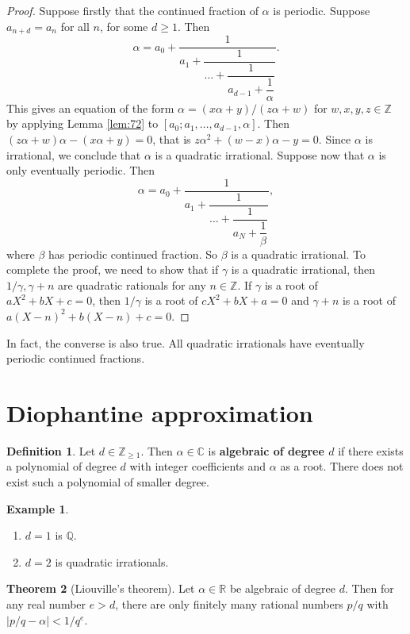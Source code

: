 \documentclass{article}
\newcommand{\Z}{\mathbb{Z}}
\newcommand{\Q}{\mathbb{Q}}
\newcommand{\R}{\mathbb{R}}
\newcommand{\C}{\mathbb{C}}
\newcommand{\rb}[1]{\left( #1 \right)}
\renewcommand{\sb}[1]{\left[ #1 \right]}
\newcommand{\abs}[1]{\left\lvert #1 \right\rvert}
\theoremstyle{definition}\newtheorem{definition}{Definition}
\theoremstyle{definition}\newtheorem{remark}[definition]{Remark}
\theoremstyle{definition}\newtheorem*{example}{Example}
\theoremstyle{definition}\newtheorem*{note}{Note}
\newtheorem{theorem}[definition]{Theorem}
\begin{document}
\begin{proof}
Suppose firstly that the continued fraction of $ \alpha $ is periodic. Suppose $ a_{n + d} = a_n $ for all $ n $, for some $ d \ge 1 $. Then
$$ \alpha = a_0 + \dfrac{1}{a_1 + \dfrac{1}{\dots + \dfrac{1}{a_{d - 1} + \dfrac{1}{\alpha}}}}. $$
This gives an equation of the form $ \alpha = \rb{x\alpha + y} / \rb{z\alpha + w} $ for $ w, x, y, z \in \Z $ by applying Lemma \ref{lem:72} to $ \sb{a_0; a_1, \dots, a_{d - 1}, \alpha} $. Then $ \rb{z\alpha + w}\alpha - \rb{x\alpha + y} = 0 $, that is $ z\alpha^2 + \rb{w - x}\alpha - y = 0 $. Since $ \alpha $ is irrational, we conclude that $ \alpha $ is a quadratic irrational. Suppose now that $ \alpha $ is only eventually periodic. Then
$$ \alpha = a_0 + \dfrac{1}{a_1 + \dfrac{1}{\dots + \dfrac{1}{a_N + \dfrac{1}{\beta}}}}, $$
where $ \beta $ has periodic continued fraction. So $ \beta $ is a quadratic irrational. To complete the proof, we need to show that if $ \gamma $ is a quadratic irrational, then $ 1 / \gamma, \gamma + n $ are quadratic rationals for any $ n \in \Z $. If $ \gamma $ is a root of $ aX^2 + bX + c = 0 $, then $ 1 / \gamma $ is a root of $ cX^2 + bX + a = 0 $ and $ \gamma + n $ is a root of $ a\rb{X - n}^2 + b\rb{X - n} + c = 0 $.
\end{proof}

In fact, the converse is also true. All quadratic irrationals have eventually periodic continued fractions.

\section{Diophantine approximation}

\begin{definition}
Let $ d \in \Z_{\ge 1} $. Then $ \alpha \in \C $ is \textbf{algebraic of degree $ d $} if there exists a polynomial of degree $ d $ with integer coefficients and $ \alpha $ as a root. There does not exist such a polynomial of smaller degree.
\end{definition}

\begin{example}
\hfill
\begin{enumerate}
\item $ d = 1 $ is $ \Q $.
\item $ d = 2 $ is quadratic irrationals.
\end{enumerate}
\end{example}

\begin{theorem}[Liouville's theorem]
Let $ \alpha \in \R $ be algebraic of degree $ d $. Then for any real number $ e > d $, there are only finitely many rational numbers $ p / q $ with $ \abs{p / q - \alpha} < 1 / q^e $.
\end{theorem}
\end{document}

